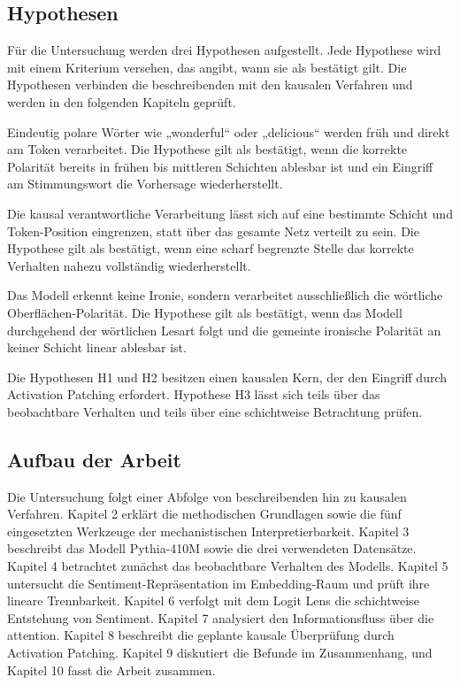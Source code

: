 \subsection{Hypothesen}

Für die Untersuchung werden drei Hypothesen aufgestellt. Jede Hypothese wird mit einem Kriterium versehen, das angibt, wann sie als bestätigt gilt. Die Hypothesen verbinden die beschreibenden mit den kausalen Verfahren und werden in den folgenden Kapiteln geprüft.

\begin{description}[style=nextline, leftmargin=0pt, font=\bfseries]
  \item[H1 (klare Stimmungswörter)] Eindeutig polare Wörter wie „wonderful“ oder „delicious“ werden früh und direkt am Token verarbeitet. Die Hypothese gilt als bestätigt, wenn die korrekte Polarität bereits in frühen bis mittleren Schichten ablesbar ist und ein Eingriff am Stimmungswort die Vorhersage wiederherstellt.
  \item[H2 (Lokalisierbarkeit)] Die kausal verantwortliche Verarbeitung lässt sich auf eine bestimmte Schicht und Token-Position eingrenzen, statt über das gesamte Netz verteilt zu sein. Die Hypothese gilt als bestätigt, wenn eine scharf begrenzte Stelle das korrekte Verhalten nahezu vollständig wiederherstellt.
  \item[H3 (Ironie und Sarkasmus)] Das Modell erkennt keine Ironie, sondern verarbeitet ausschließlich die wörtliche Oberflächen-Polarität. Die Hypothese gilt als bestätigt, wenn das Modell durchgehend der wörtlichen Lesart folgt und die gemeinte ironische Polarität an keiner Schicht linear ablesbar ist.
\end{description}

Die Hypothesen H1 und H2 besitzen einen kausalen Kern, der den Eingriff durch Activation Patching erfordert. Hypothese H3 lässt sich teils über das beobachtbare Verhalten und teils über eine schichtweise Betrachtung prüfen.

\subsection{Aufbau der Arbeit}

Die Untersuchung folgt einer Abfolge von beschreibenden hin zu kausalen Verfahren. Kapitel 2 erklärt die methodischen Grundlagen sowie die fünf eingesetzten Werkzeuge der mechanistischen Interpretierbarkeit. Kapitel 3 beschreibt das Modell Pythia-410M sowie die drei verwendeten Datensätze. Kapitel 4 betrachtet zunächst das beobachtbare Verhalten des Modells. Kapitel 5 untersucht die Sentiment-Repräsentation im Embedding-Raum und prüft ihre lineare Trennbarkeit. Kapitel 6 verfolgt mit dem Logit Lens die schichtweise Entstehung von Sentiment. Kapitel 7 analysiert den Informationsfluss über die \gls{attention}. Kapitel 8 beschreibt die geplante kausale Überprüfung durch Activation Patching. Kapitel 9 diskutiert die Befunde im Zusammenhang, und Kapitel 10 fasst die Arbeit zusammen.
